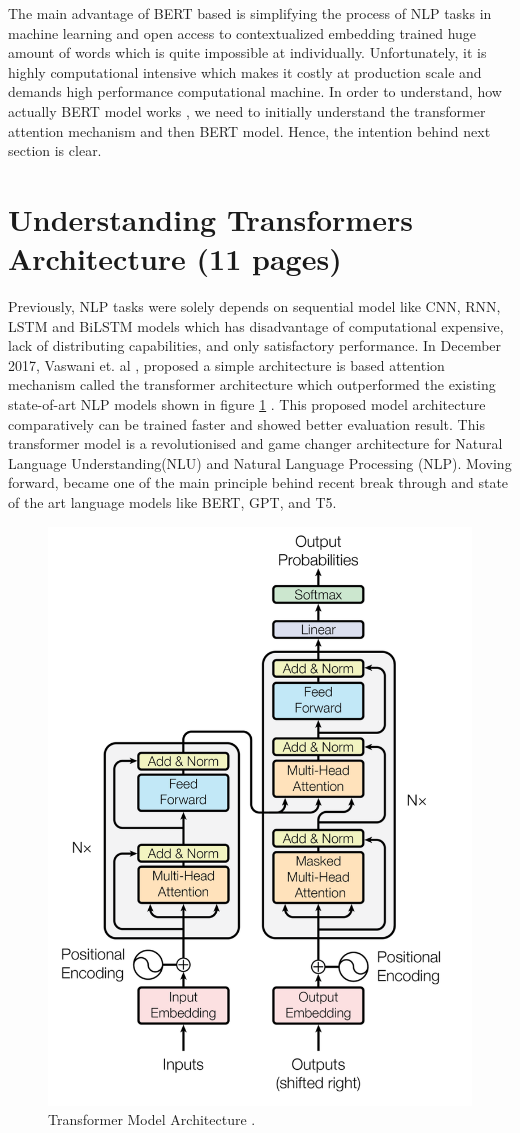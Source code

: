 \documentclass[%
	BCOR=8mm, %
	DIV=12, 
	toc=bibliography, %
	toc=listof, %
	oneside, %
	egregdoesnotlikesansseriftitles, %
	]{scrbook}
\begin{document}
 The main advantage of BERT based is simplifying the process of NLP tasks in machine learning and open access to contextualized embedding trained huge amount of words which is quite impossible at individually. Unfortunately, it is highly computational intensive which makes it costly at production scale and demands high performance computational machine.
In order to understand, how actually BERT model works , we need to initially understand the transformer attention mechanism and then BERT model. Hence, the intention behind next section is clear.
\section{Understanding Transformers Architecture (11 pages)}
\begin{itemize}
\end{itemize}
Previously, NLP tasks were solely depends on sequential model like CNN, RNN, LSTM and BiLSTM models which has disadvantage of computational expensive, lack of distributing capabilities, and only satisfactory performance. In December 2017, Vaswani et. al \cite{vaswani_attention_2017}, proposed a simple architecture is based attention mechanism called the transformer architecture which outperformed the existing state-of-art NLP models shown in figure \ref{diag:TransformerArchitecture} . This proposed model architecture  comparatively can be  trained faster and showed better evaluation result. This transformer model is a revolutionised and game changer architecture for Natural Language Understanding(NLU) and Natural Language Processing (NLP). Moving forward, became one of the main principle behind recent break through and state of the art language models like BERT, GPT, and T5.\\ 
\begin{figure}[h!]
\centering
\includegraphics[width=.50\textwidth]{img/TransformerArchitecture.png}
\caption[Transformer Architecture]{Transformer Model Architecture \cite{vaswani_attention_2017}.}
\label{diag:TransformerArchitecture}
\end{figure}
\end{document}
